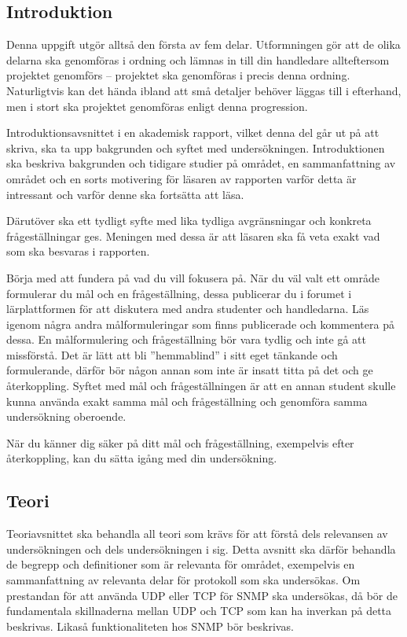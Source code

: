 \documentclass[a4paper,nocourse]{miunasgn}
\begin{document}
\subsection{Introduktion}

Denna uppgift utgör alltså den första av fem delar.
Utformningen gör att de olika delarna ska genomföras i ordning och lämnas in 
till din handledare allteftersom projektet genomförs -- projektet ska 
genomföras i precis denna ordning.
Naturligtvis kan det hända ibland att små detaljer behöver läggas till 
i efterhand, men i stort ska projektet genomföras enligt denna progression.

Introduktionsavsnittet i en akademisk rapport, vilket denna del går ut på att 
skriva, ska ta upp bakgrunden och syftet med undersökningen.
Introduktionen ska beskriva bakgrunden och tidigare studier på området, en 
sammanfattning av området och en sorts motivering för läsaren av rapporten 
varför detta är intressant och varför denne ska fortsätta att läsa.

Därutöver ska ett tydligt syfte med lika tydliga avgränsningar och konkreta 
frågeställningar ges.
Meningen med dessa är att läsaren ska få veta exakt vad som ska besvaras 
i rapporten.

Börja med att fundera på vad du vill fokusera på.
När du väl valt ett område formulerar du mål och en frågeställning, dessa 
publicerar du i forumet i lärplattformen för att diskutera med andra studenter 
och handledarna.
Läs igenom några andra målformuleringar som finns publicerade och kommentera på 
dessa.
En målformulering och frågeställning bör vara tydlig och inte gå att 
missförstå.
Det är lätt att bli ''hemmablind'' i sitt eget tänkande och formulerande, 
därför bör någon annan som inte är insatt titta på det och ge återkoppling.
Syftet med mål och frågeställningen är att en annan student skulle kunna 
använda exakt samma mål och frågeställning och genomföra samma undersökning 
oberoende.

När du känner dig säker på ditt mål och frågeställning, exempelvis efter 
återkoppling, kan du sätta igång med din undersökning.

\subsection{Teori}

Teoriavsnittet ska behandla all teori som krävs för att förstå dels relevansen 
av undersökningen och dels undersökningen i sig.
Detta avsnitt ska därför behandla de begrepp och definitioner som är relevanta 
för området, exempelvis en sammanfattning av relevanta delar för protokoll som 
ska undersökas.
Om prestandan för att använda UDP eller TCP för SNMP ska undersökas, då bör de 
fundamentala skillnaderna mellan UDP och TCP som kan ha inverkan på detta 
beskrivas.
Likaså funktionaliteten hos SNMP bör beskrivas.
\end{document}
